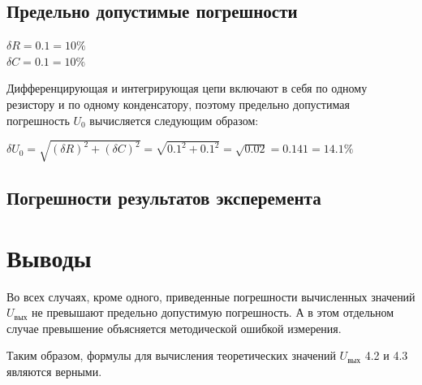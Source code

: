 \subsection{Предельно допустимые погрешности}

\begin{center}
$\delta R = 0.1 = 10\%$\\
$\delta C = 0.1 = 10\%$\\
\end{center}

Дифференцирующая и интегрирующая цепи включают в себя по одному резистору и по одному конденсатору, поэтому предельно допустимая погрешность $U_0$ вычисляется следующим образом:


$\delta U_0 = \sqrt{(\delta R)^2 + (\delta C)^2} = \sqrt{0.1^2 + 0.1^2} = \sqrt{0.02} = 0.141 = 14.1 \%$

\subsection{Погрешности результатов эксперемента} %

  
\section{Выводы}

Во всех случаях, кроме одного, приведенные погрешности вычисленных значений $U_\text{вых}$ не превышают предельно допустимую погрешность. А в этом отдельном случае превышение объясняется методической ошибкой измерения.

Таким образом, формулы для вычисления теоретических значений $U_\text{вых}$ 4.2 и 4.3 являются верными.


